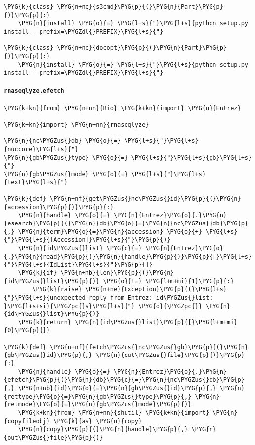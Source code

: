 \begin{Verbatim}[commandchars=\\\{\}]
\PYG{k}{class} \PYG{n+nc}{s3cmd}\PYG{p}{(}\PYG{n}{Part}\PYG{p}{)}\PYG{p}{:}
    \PYG{n}{install} \PYG{o}{=} \PYG{l+s}{"}\PYG{l+s}{python setup.py install --prefix=\PYGZdl{}PREFIX}\PYG{l+s}{"}

\PYG{k}{class} \PYG{n+nc}{docopt}\PYG{p}{(}\PYG{n}{Part}\PYG{p}{)}\PYG{p}{:}
    \PYG{n}{install} \PYG{o}{=} \PYG{l+s}{"}\PYG{l+s}{python setup.py install --prefix=\PYGZdl{}PREFIX}\PYG{l+s}{"}
\end{Verbatim}


\paragraph{\texttt{rnaseqlyze.efetch}}
\label{index-pdf4:rnaseqlyze-efetch}
\begin{Verbatim}[commandchars=\\\{\}]
\PYG{k+kn}{from} \PYG{n+nn}{Bio} \PYG{k+kn}{import} \PYG{n}{Entrez}

\PYG{k+kn}{import} \PYG{n+nn}{rnaseqlyze}

\PYG{n}{nc\PYGZus{}db} \PYG{o}{=} \PYG{l+s}{"}\PYG{l+s}{nuccore}\PYG{l+s}{"}
\PYG{n}{gb\PYGZus{}type} \PYG{o}{=} \PYG{l+s}{"}\PYG{l+s}{gb}\PYG{l+s}{"}
\PYG{n}{gb\PYGZus{}mode} \PYG{o}{=} \PYG{l+s}{"}\PYG{l+s}{text}\PYG{l+s}{"}

\PYG{k}{def} \PYG{n+nf}{get\PYGZus{}nc\PYGZus{}id}\PYG{p}{(}\PYG{n}{accession}\PYG{p}{)}\PYG{p}{:}
    \PYG{n}{handle} \PYG{o}{=} \PYG{n}{Entrez}\PYG{o}{.}\PYG{n}{esearch}\PYG{p}{(}\PYG{n}{db}\PYG{o}{=}\PYG{n}{nc\PYGZus{}db}\PYG{p}{,} \PYG{n}{term}\PYG{o}{=}\PYG{n}{accession} \PYG{o}{+} \PYG{l+s}{"}\PYG{l+s}{[Accession]}\PYG{l+s}{"}\PYG{p}{)}
    \PYG{n}{id\PYGZus{}list} \PYG{o}{=} \PYG{n}{Entrez}\PYG{o}{.}\PYG{n}{read}\PYG{p}{(}\PYG{n}{handle}\PYG{p}{)}\PYG{p}{[}\PYG{l+s}{"}\PYG{l+s}{IdList}\PYG{l+s}{"}\PYG{p}{]}
    \PYG{k}{if} \PYG{n+nb}{len}\PYG{p}{(}\PYG{n}{id\PYGZus{}list}\PYG{p}{)} \PYG{o}{!=} \PYG{l+m+mi}{1}\PYG{p}{:}
        \PYG{k}{raise} \PYG{n+ne}{Exception}\PYG{p}{(}\PYG{l+s}{"}\PYG{l+s}{unexpected reply from Entrez: id\PYGZus{}list: }\PYG{l+s+si}{\PYGZpc{}s}\PYG{l+s}{"} \PYG{o}{\PYGZpc{}} \PYG{n}{id\PYGZus{}list}\PYG{p}{)}
    \PYG{k}{return} \PYG{n}{id\PYGZus{}list}\PYG{p}{[}\PYG{l+m+mi}{0}\PYG{p}{]}

\PYG{k}{def} \PYG{n+nf}{fetch\PYGZus{}nc\PYGZus{}gb}\PYG{p}{(}\PYG{n}{gb\PYGZus{}id}\PYG{p}{,} \PYG{n}{out\PYGZus{}file}\PYG{p}{)}\PYG{p}{:}
    \PYG{n}{handle} \PYG{o}{=} \PYG{n}{Entrez}\PYG{o}{.}\PYG{n}{efetch}\PYG{p}{(}\PYG{n}{db}\PYG{o}{=}\PYG{n}{nc\PYGZus{}db}\PYG{p}{,} \PYG{n+nb}{id}\PYG{o}{=}\PYG{n}{gb\PYGZus{}id}\PYG{p}{,} \PYG{n}{rettype}\PYG{o}{=}\PYG{n}{gb\PYGZus{}type}\PYG{p}{,} \PYG{n}{retmode}\PYG{o}{=}\PYG{n}{gb\PYGZus{}mode}\PYG{p}{)}
    \PYG{k+kn}{from} \PYG{n+nn}{shutil} \PYG{k+kn}{import} \PYG{n}{copyfileobj} \PYG{k}{as} \PYG{n}{copy}
    \PYG{n}{copy}\PYG{p}{(}\PYG{n}{handle}\PYG{p}{,} \PYG{n}{out\PYGZus{}file}\PYG{p}{)}
\end{Verbatim}


